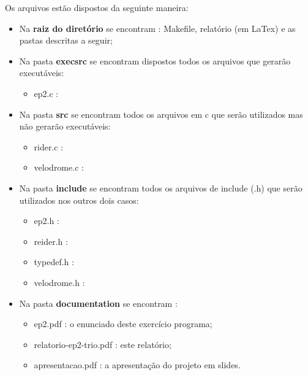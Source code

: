 \documentclass[12pt,a4paper]{article}
\begin{document}
	Os arquivos estão dispostos da seguinte maneira:
    \begin{itemize} %
    
    \item Na \textbf{raiz do diretório} se encontram : Makefile, relatório (em LaTex) e as pastas descritas a seguir;
    \item Na pasta \textbf{execsrc} se encontram dispostos todos os arquivos que gerarão executáveis:
    	
 	\begin{itemize} %
    \item ep2.c : %
 	\end{itemize} %
    
    \item Na pasta \textbf{src} se encontram todos os arquivos em c que serão utilizados mas não gerarão executáveis:
    
 	\begin{itemize} %
    \item rider.c : %
    \item velodrome.c : %
 	\end{itemize} %
    
    \item Na pasta \textbf{include} se encontram todos os arquivos de include (.h) que serão utilizados nos outros dois casos:
     
    \begin{itemize} %
    \item ep2.h : %
    \item reider.h : %
 	\item typedef.h : %
 	\item velodrome.h : %
 	\end{itemize} %
    
    \item Na pasta \textbf{documentation} se encontram :
    
    	\begin{itemize} %
        \item ep2.pdf : o enunciado deste exercício programa;
        \item relatorio-ep2-trio.pdf : este relatório;
        \item apresentacao.pdf : a apresentação do projeto em slides.
        \end{itemize} %
        

\end{itemize}
\end{document}
